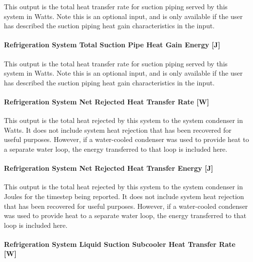 This output is the total heat transfer rate for suction piping served by this system in Watts. Note this is an optional input, and is only available if the user has described the suction piping heat gain characteristics in the input.

\paragraph{Refrigeration System Total Suction Pipe Heat Gain Energy {[}J{]}}\label{refrigeration-system-total-suction-pipe-heat-gain-energy-j}

This output is the total heat transfer rate for suction piping served by this system in Watts. Note this is an optional input, and is only available if the user has described the suction piping heat gain characteristics in the input.

\paragraph{Refrigeration System Net Rejected Heat Transfer Rate {[}W{]}}\label{refrigeration-system-net-rejected-heat-transfer-rate-w}

This output is the total heat rejected by this system to the system condenser in Watts. It does not include system heat rejection that has been recovered for useful purposes. However, if a water-cooled condenser was used to provide heat to a separate water loop, the energy transferred to that loop is included here.

\paragraph{Refrigeration System Net Rejected Heat Transfer Energy {[}J{]}}\label{refrigeration-system-net-rejected-heat-transfer-energy-j}

This output is the total heat rejected by this system to the system condenser in Joules for the timestep being reported. It does not include system heat rejection that has been recovered for useful purposes. However, if a water-cooled condenser was used to provide heat to a separate water loop, the energy transferred to that loop is included here.

\paragraph{Refrigeration System Liquid Suction Subcooler Heat Transfer Rate {[}W{]}}\label{refrigeration-system-liquid-suction-subcooler-heat-transfer-rate-w}

